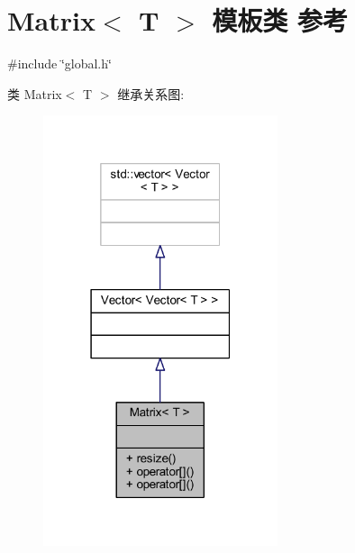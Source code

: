 \hypertarget{classMatrix}{}\section{Matrix$<$ T $>$ 模板类 参考}
\label{classMatrix}


{\ttfamily \#include \char`\"{}global.\+h\char`\"{}}



类 Matrix$<$ T $>$ 继承关系图\+:
\nopagebreak
\begin{figure}[H]
\begin{center}
\leavevmode
\includegraphics[width=195pt]{classMatrix__inherit__graph}
\end{center}
\end{figure}


